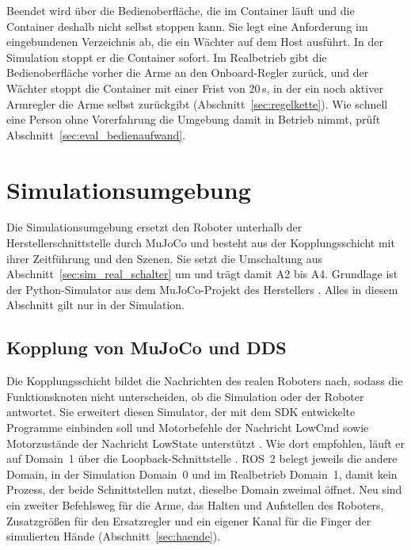 Beendet wird über die Bedienoberfläche, die im Container läuft und die Container deshalb nicht selbst stoppen kann.
Sie legt eine Anforderung im eingebundenen Verzeichnis ab, die ein Wächter auf dem Host ausführt.
In der Simulation stoppt er die Container sofort.
Im Realbetrieb gibt die Bedienoberfläche vorher die Arme an den Onboard-Regler zurück, und der Wächter stoppt die Container mit einer Frist von 20\,s, in der ein noch aktiver Armregler die Arme selbst zurückgibt (Abschnitt~\ref{sec:regelkette}).
Wie schnell eine Person ohne Vorerfahrung die Umgebung damit in Betrieb nimmt, prüft Abschnitt~\ref{sec:eval_bedienaufwand}.

\section{Simulationsumgebung}
\label{sec:simulationsumgebung}
Die Simulationsumgebung ersetzt den Roboter unterhalb der Herstellerschnittstelle durch MuJoCo und besteht aus der Kopplungsschicht mit ihrer Zeitführung und den Szenen.
Sie setzt die Umschaltung aus Abschnitt~\ref{sec:sim_real_schalter} um und trägt damit A2 bis A4.
Grundlage ist der Python-Simulator aus dem MuJoCo-Projekt des Herstellers \cite{UnitreeMujoco}.
Alles in diesem Abschnitt gilt nur in der Simulation.

\subsection{Kopplung von MuJoCo und DDS}
\label{sec:bridge}
Die Kopplungsschicht bildet die Nachrichten des realen Roboters nach, sodass die Funktionsknoten nicht unterscheiden, ob die Simulation oder der Roboter antwortet.
Sie erweitert diesen Simulator, der mit dem SDK entwickelte Programme einbinden soll \cite{UnitreeMujoco} und Motorbefehle der Nachricht LowCmd sowie Motorzustände der Nachricht LowState unterstützt \cite{UnitreeMujoco}.
Wie dort empfohlen, läuft er auf Domain~1 über die Loopback-Schnittstelle \cite{UnitreeMujoco}.
ROS~2 belegt jeweils die andere Domain, in der Simulation Domain~0 und im Realbetrieb Domain~1, damit kein Prozess, der beide Schnittstellen nutzt, dieselbe Domain zweimal öffnet.
Neu sind ein zweiter Befehlsweg für die Arme, das Halten und Aufstellen des Roboters, Zusatzgrößen für den Ersatzregler und ein eigener Kanal für die Finger der simulierten Hände (Abschnitt~\ref{sec:haende}).

